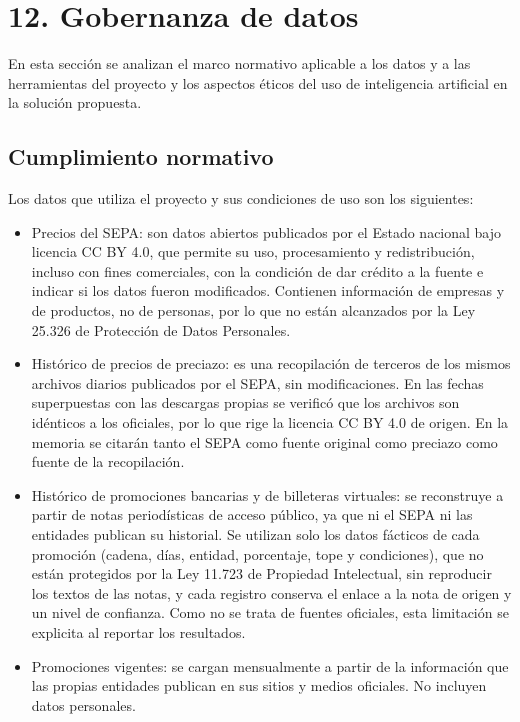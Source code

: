 \documentclass[
11pt, %
]{charter}
\begin{document}
\section{12. Gobernanza de datos}
\label{sec:gobernanza}

En esta sección se analizan el marco normativo aplicable a los datos y a las herramientas del proyecto y los aspectos éticos del uso de inteligencia artificial en la solución propuesta.

\subsection{Cumplimiento normativo}

Los datos que utiliza el proyecto y sus condiciones de uso son los siguientes:

\begin{itemize}
	\item Precios del SEPA: son datos abiertos publicados por el Estado nacional bajo licencia CC BY 4.0, que permite su uso, procesamiento y redistribución, incluso con fines comerciales, con la condición de dar crédito a la fuente e indicar si los datos fueron modificados. Contienen información de empresas y de productos, no de personas, por lo que no están alcanzados por la Ley 25.326 de Protección de Datos Personales.
	\item Histórico de precios de preciazo: es una recopilación de terceros de los mismos archivos diarios publicados por el SEPA, sin modificaciones. En las fechas superpuestas con las descargas propias se verificó que los archivos son idénticos a los oficiales, por lo que rige la licencia CC BY 4.0 de origen. En la memoria se citarán tanto el SEPA como fuente original como preciazo como fuente de la recopilación.
	\item Histórico de promociones bancarias y de billeteras virtuales: se reconstruye a partir de notas periodísticas de acceso público, ya que ni el SEPA ni las entidades publican su historial. Se utilizan solo los datos fácticos de cada promoción (cadena, días, entidad, porcentaje, tope y condiciones), que no están protegidos por la Ley 11.723 de Propiedad Intelectual, sin reproducir los textos de las notas, y cada registro conserva el enlace a la nota de origen y un nivel de confianza. Como no se trata de fuentes oficiales, esta limitación se explicita al reportar los resultados.
	\item Promociones vigentes: se cargan mensualmente a partir de la información que las propias entidades publican en sus sitios y medios oficiales. No incluyen datos personales.

\end{itemize}
\end{document}
